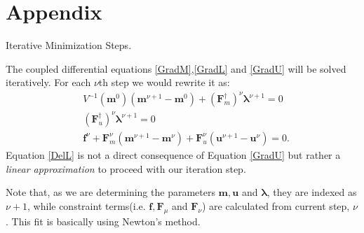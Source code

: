 \documentclass[
	xcolor=dvipsnames,
	aspectratio=169,	
	10pt, 
	]{beamer}
\begin{document}
\section{Appendix}
\begin{frame}{Iterative Minimization Steps.}
	\begin{block}{}
		The coupled differential equations \eqref{GradM},\eqref{GradL} and \eqref{GradU} will be solved iteratively. For each $\nu$th step we would rewrite it as:
		\begin{align}
			&V^{-1}(\mathbf m^0)(\mathbf{m}^{\nu+1}-\mathbf{m}^0)+(\mathbf{F}_m^\dagger)^\nu\mathbf\lambda^{\nu+1}=0\label{DelM}\\
			&(\mathbf{F}_u^\dagger)^\nu\mathbf\lambda^{\nu+1}=0\label{DelU}\\
			&\mathbf f^\nu + \mathbf F^\nu_m (\mathbf m^{\nu+1}-\mathbf m^\nu) + \mathbf F^\nu_u(\mathbf u^{\nu+1}-\mathbf u^\nu)=0\label{DelL}.
		\end{align}
		Equation \eqref{DelL} is not a direct consequence of Equation \eqref{GradU} but rather a \textit{linear approximation} to proceed with our iteration step.  
		
		Note that, as we are determining the parameters $\mathbf m, \mathbf u$ and $\mathbf \lambda$, they are indexed as $\nu+1$, while constraint terms(i.e. $\mathbf f,\mathbf F_\mu$ and $\mathbf F_\nu$) are calculated from current step, $\nu$. This fit is basically using Newton's method.
	\end{block}
\end{frame}
\end{document}
